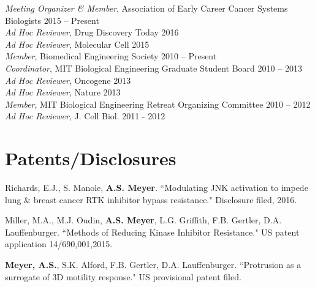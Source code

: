 \documentclass[11pt]{res}
\begin{document}
\begin{resume}
{\sl Meeting Organizer \& Member}, Association of Early Career Cancer Systems Biologists \hfill 2015 -- Present \\
{\sl Ad Hoc Reviewer}, Drug Discovery Today \hfill 2016 \\
{\sl Ad Hoc Reviewer}, Molecular Cell \hfill 2015 \\
{\sl Member}, Biomedical Engineering Society \hfill 2010 -- Present \\
{\sl Coordinator}, MIT Biological Engineering Graduate Student Board \hfill 2010 -- 2013 \\
{\sl Ad Hoc Reviewer}, Oncogene \hfill 2013 \\
{\sl Ad Hoc Reviewer}, Nature \hfill 2013 \\
{\sl Member}, MIT Biological Engineering Retreat Organizing Committee \hfill 2010 -- 2012 \\
{\sl Ad Hoc Reviewer}, J. Cell Biol. \hfill 2011 - 2012 \\

\section{Patents/Disclosures}

Richards, E.J., S. Manole, {\bf A.S. Meyer}. ``Modulating JNK activation to impede lung \& breast cancer RTK inhibitor bypass resistance." Disclosure filed, 2016.

Miller, M.A., M.J. Oudin, {\bf A.S. Meyer}, L.G. Griffith, F.B. Gertler, D.A. Lauffenburger. ``Methods of Reducing Kinase Inhibitor Resistance." US patent application 14/690,001,2015.

{\bf Meyer, A.S.}, S.K. Alford, F.B. Gertler, D.A. Lauffenburger. ``Protrusion as a surrogate of 3D motility response." US provisional patent filed.

\end{resume} 
\end{document}
